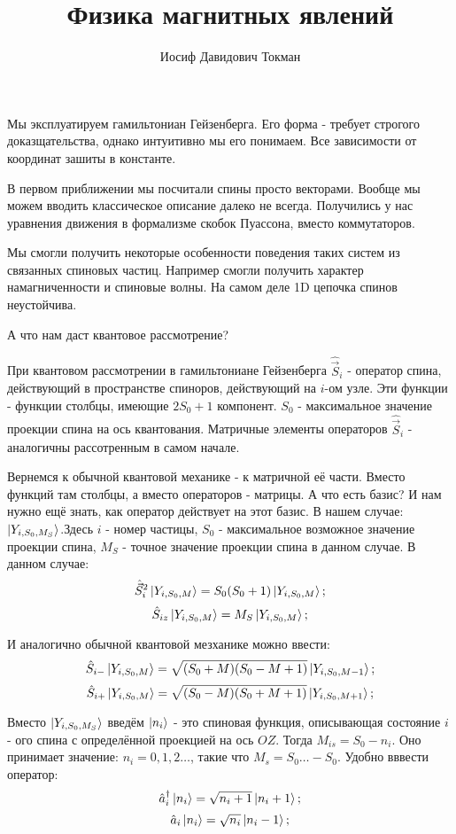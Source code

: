 \documentclass[a4paper, 14pt, russian]{article}
\title{Физика магнитных явлений}
\author{Иосиф Давидович Токман}
\date{}
\newcommand{\be}{\begin{equation}}
\newcommand{\ee}{\end{equation}}
\begin{document}
	\maketitle

	Мы эксплуатируем гамильтониан Гейзенберга. Его форма - требует строгого
	доказщательства, однако интуитивно мы его понимаем. Все зависимости
	от координат зашиты в константе.

	В первом приближении мы посчитали спины просто векторами. Вообще
	мы можем вводить классическое описание далеко не всегда. Получились 
	у нас уравнения движения в формализме скобок Пуассона, вместо
	коммутаторов.

	Мы смогли получить некоторые особенности поведения таких систем из
	связанных спиновых частиц. Например смогли получить характер 
	намагниченности и спиновые волны. На самом деле 1D цепочка 
	спинов неустойчива.

	А что нам даст квантовое рассмотрение?

	При квантовом рассмотрении в гамильтониане Гейзенберга
	$\hat{\vec S}_i$ - оператор спина, действующий в пространстве спиноров,
	действующий на $i$-ом узле. Эти функции - функции столбцы, имеющие
	$2 S_0 + 1$ компонент. $S_0$ - максимальное значение проекции спина на ось 
	квантования. Матричные элементы операторов $\hat{\vec S}_i$ - 
	аналогичны рассотренным в самом начале.

	Вернемся к обычной квантовой механике - к матричной её части. Вместо 
	функций там столбцы, а вместо операторов - матрицы. А что есть базис?
	И нам нужно ещё знать, как оператор действует на этот базис. В нашем
	случае: $\ket{Y_{i,S_0,M_S}}$.Здесь $i$ - номер частицы, $S_0$ - максимальное
	возможное значение проекции спина, $M_S$ - точное значение проекции спина 
	в данном случае. В данном случае:
	\be
		\label{eq120}
		\hat{\vec S}_i^2 \ket{Y_{i,S_0,M}} = S_0 (S_0 + 1) \ket{Y_{i,S_0,M}};
	\ee
	\be
		\hat{S}_{iz} \ket{Y_{i,S_0,M}} = M_S \ket{Y_{i,S_0,M}};
	\ee

	И аналогично обычной квантовой мезханике можно ввести:
	\be
		\hat{S}_{i-} \ket{Y_{i,S_0,M}} = \sqrt{(S_0 + M)(S_0 - M + 1)} 
			\ket{Y_{i,S_0,M - 1}};
	\ee
	\be
		\hat{S}_{i+} \ket{Y_{i,S_0,M}} = \sqrt{(S_0 - M)(S_0 + M + 1)} 
			\ket{Y_{i,S_0,M + 1}};
	\ee

	Вместо $\ket{Y_{i,S_0,M_S}}$ введём $\ket{n_i}$ - это спиновая функция,
	описывающая состояние $i$ - ого спина с определённой проекцией на ось $OZ$.
	Тогда $M_{is} = S_0 - n_i$. Оно принимает значение: $n_i = 0,1,2\hdots$, 
	такие что $M_s = S_0 \hdots -S_0$. Удобно вввести оператор:
	\be
		\hat{a}^\dagger_i \ket{n_i} = \sqrt{n_i + 1} \ket{n_i + 1};
	\ee
	\be
		\hat{a}_i \ket{n_i} = \sqrt{n_i} \ket{n_i - 1};
	\ee
\end{document}
